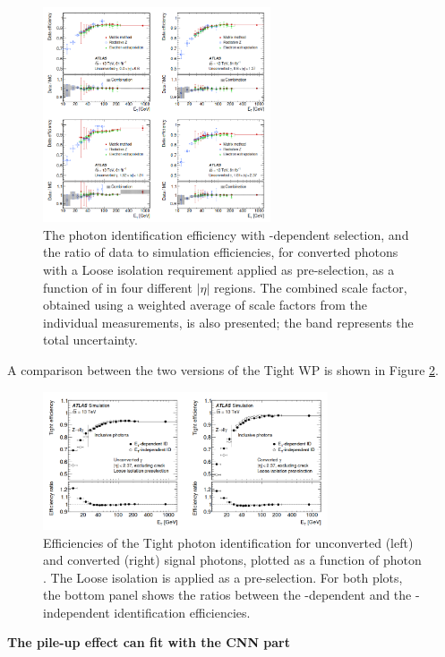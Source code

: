 \begin{figure}[ht]
    \centering
    \includegraphics[width=0.6\textwidth]{Ch3/Img/Unconverted_Eff_2017.png}
    \caption{The photon identification efficiency with \eT-dependent selection, and the ratio of data to simulation efficiencies, for converted photons with a Loose isolation requirement applied as pre-selection, as a function of \eT in four different $|\eta|$ regions. The combined scale factor, obtained using a weighted average of scale factors from the individual measurements, is also presented; the band represents the total uncertainty.}
    \label{fig:gamma:ID:Eff:Cov}
\end{figure}
A comparison between the two versions of the Tight WP is shown in Figure \ref{fig:gamma:ID:Eff:Tight}.
\begin{figure}[ht]
    \centering
    \includegraphics[width=0.75\textwidth]{Ch3/Img/Tight_ID.png}
    \caption{Efficiencies of the Tight photon identification for unconverted (left) and converted (right) signal photons, plotted as a function of photon \eT. The Loose isolation  is applied as a pre-selection. For both plots, the bottom panel shows the ratios between the \eT-dependent and the \eT-independent identification efficiencies.}
    \label{fig:gamma:ID:Eff:Tight}
\end{figure}
\textbf{The pile-up effect can fit with the CNN part}
